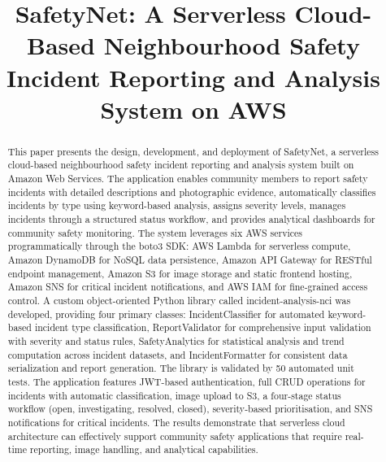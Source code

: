 \documentclass[conference]{IEEEtran}
\begin{document}
\title{SafetyNet: A Serverless Cloud-Based Neighbourhood Safety Incident Reporting and Analysis System on AWS}

\author{
}

\maketitle

\begin{abstract}
This paper presents the design, development, and deployment of SafetyNet, a serverless cloud-based neighbourhood safety incident reporting and analysis system built on Amazon Web Services. The application enables community members to report safety incidents with detailed descriptions and photographic evidence, automatically classifies incidents by type using keyword-based analysis, assigns severity levels, manages incidents through a structured status workflow, and provides analytical dashboards for community safety monitoring. The system leverages six AWS services programmatically through the boto3 SDK: AWS Lambda for serverless compute, Amazon DynamoDB for NoSQL data persistence, Amazon API Gateway for RESTful endpoint management, Amazon S3 for image storage and static frontend hosting, Amazon SNS for critical incident notifications, and AWS IAM for fine-grained access control. A custom object-oriented Python library called incident-analysis-nci was developed, providing four primary classes: IncidentClassifier for automated keyword-based incident type classification, ReportValidator for comprehensive input validation with severity and status rules, SafetyAnalytics for statistical analysis and trend computation across incident datasets, and IncidentFormatter for consistent data serialization and report generation. The library is validated by 50 automated unit tests. The application features JWT-based authentication, full CRUD operations for incidents with automatic classification, image upload to S3, a four-stage status workflow (open, investigating, resolved, closed), severity-based prioritisation, and SNS notifications for critical incidents. The results demonstrate that serverless cloud architecture can effectively support community safety applications that require real-time reporting, image handling, and analytical capabilities.
\end{abstract}
\end{document}
